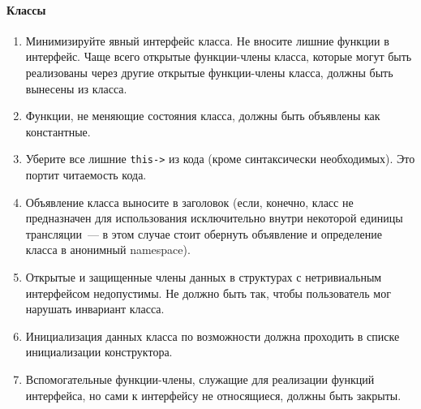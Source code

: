 \documentclass[a4paper,10pt]{article}
\begin{document}
\paragraph{Классы}
\begin{enumerate}
    \item Минимизируйте явный интерфейс класса. Не вносите лишние функции в
        интерфейс. Чаще всего открытые функции-члены класса, которые могут быть
        реализованы через другие открытые функции-члены класса, должны быть
        вынесены из класса. 
    \item Функции, не меняющие состояния класса, должны быть объявлены как
        константные.
    \item Уберите все лишние {\verb!this->!} из кода (кроме синтаксически необходимых).
        Это портит читаемость кода.
    \item Объявление класса выносите в заголовок (если, конечно, класс не
        предназначен для использования исключительно внутри некоторой единицы
        трансляции~— в этом случае стоит обернуть объявление и определение
        класса в анонимный namespace). 
    \item Открытые и защищенные члены данных в структурах с нетривиальным
        интерфейсом недопустимы. Не должно быть так, чтобы пользователь мог
        нарушать инвариант класса. 
    \item Инициализация данных класса по возможности должна проходить в списке
        инициализации конструктора.
    \item Вспомогательные функции-члены, служащие для реализации функций
        интерфейса, но сами к интерфейсу не относящиеся, должны быть закрыты.
\end{enumerate}
\end{document}
